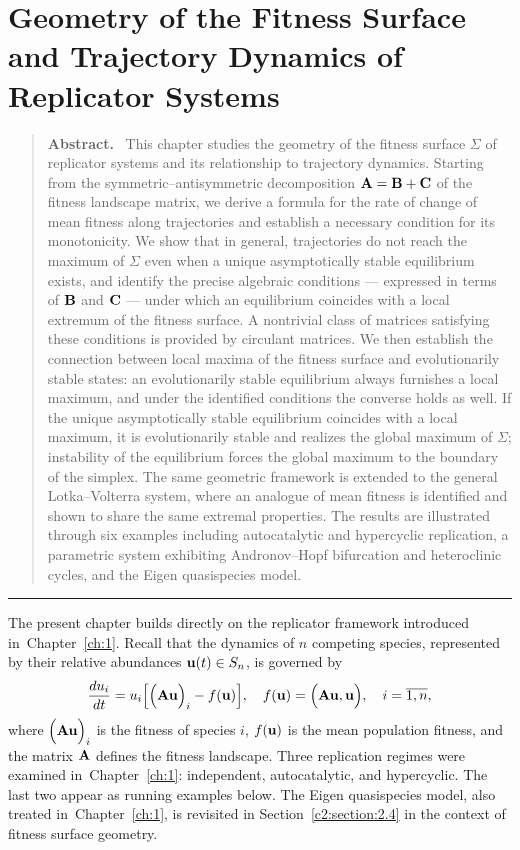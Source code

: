 \documentclass[12pt]{report}
\theoremstyle{definition}
\theoremstyle{remark}
\newenvironment{chapterabstract}
  {\begin{quotation}\small\noindent\textbf{Abstract.}\ }
  {\end{quotation}}
\begin{document}
\chapter{Geometry of the Fitness Surface and Trajectory Dynamics of Replicator Systems}
\label{ch:2}

\begin{chapterabstract}
This chapter studies the geometry of the fitness surface $\Sigma$ of replicator 
systems and its relationship to trajectory dynamics. Starting from the 
symmetric--antisymmetric decomposition ${\bf A} = {\bf B} + {\bf C}$ of the 
fitness landscape matrix, we derive a formula for the rate of change of mean 
fitness along trajectories and establish a necessary condition for its 
monotonicity. We show that in general, trajectories do not reach the maximum of 
$\Sigma$ even when a unique asymptotically stable equilibrium exists, and 
identify the precise algebraic conditions --- expressed in terms of ${\bf B}$ 
and ${\bf C}$ --- under which an equilibrium coincides with a local extremum of 
the fitness surface. A nontrivial class of matrices satisfying these conditions 
is provided by circulant matrices. We then establish the connection between local 
maxima of the fitness surface and evolutionarily stable states: an evolutionarily 
stable equilibrium always furnishes a local maximum, and under the identified 
conditions the converse holds as well. If the unique asymptotically stable 
equilibrium coincides with a local maximum, it is evolutionarily stable and 
realizes the global maximum of $\Sigma$; instability of the equilibrium forces 
the global maximum to the boundary of the simplex. The same geometric framework 
is extended to the general Lotka--Volterra system, where an analogue of mean 
fitness is identified and shown to share the same extremal properties. The 
results are illustrated through six examples including autocatalytic and 
hypercyclic replication, a parametric system exhibiting Andronov--Hopf 
bifurcation and heteroclinic cycles, and the Eigen quasispecies model.
\end{chapterabstract}	


\bigskip\hrule\bigskip

The present chapter builds directly on the replicator framework introduced
in~Chapter~\ref{ch:1}. Recall that the dynamics of $n$ competing species,
represented by their relative abundances ${\bf u}(t) \in S_n$, is governed by
\begin{equation}\label{c2:eq1.5}
    \frac{du_{i}}{dt} = u_{i}\Big[\Big({\bf Au}\Big)_{i} - f({\bf u})\Big],
    \quad f({\bf u}) = \Big({\bf Au, u}\Big), \quad i = \overline{1,n},
\end{equation}
where $\Big({\bf Au}\Big)_i$ is the fitness of species $i$, $f({\bf u})$ is the
mean population fitness, and the matrix ${\bf A}$ defines the fitness landscape.
Three replication regimes were examined in~Chapter~\ref{ch:1}: independent,
autocatalytic, and hypercyclic. The last two appear
as running examples below. The Eigen quasispecies model,
also treated in~Chapter~\ref{ch:1}, is revisited in Section~\ref{c2:section:2.4}
in the context of fitness surface geometry.
\end{document}
